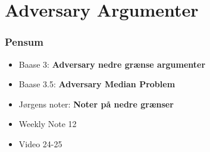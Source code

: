 \section{Adversary Argumenter}%
\label{sec:adversaryargumenter}

\begin{frame}
  \frametitle{Pensum}
  \begin{itemize}
    \item Baase 3: \textbf{Adversary nedre grænse argumenter}
    \item Baase 3.5: \textbf{Adversary Median Problem}
    \item Jørgens noter: \textbf{Noter på nedre grænser}
    \item Weekly Note 12
    \item Video 24-25
  \end{itemize}
\end{frame}



